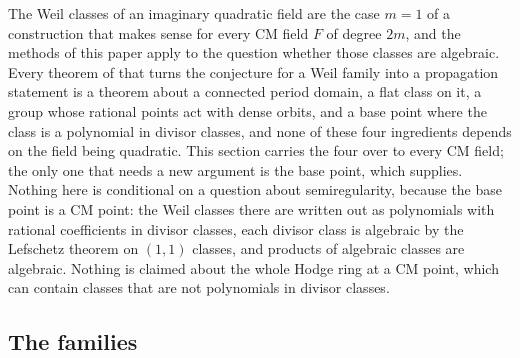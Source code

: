 \documentclass[11pt,reqno]{amsart}
\theoremstyle{plain}
\theoremstyle{definition}
\theoremstyle{remark}
\begin{document}
The Weil classes of an imaginary quadratic field are the case $m=1$ of a
construction that makes sense for every CM field $F$ of degree $2m$, and the
methods of this paper apply to the question whether those classes are
algebraic. Every theorem of  that turns the conjecture
for a Weil family into a propagation statement is a theorem about a connected
period domain, a flat class on it, a group whose rational points act with
dense orbits, and a base point where the class is a polynomial in divisor
classes, and none of these four ingredients depends on the field being
quadratic. This section carries the four over to every CM field; the only
one that needs a new argument is the base point, which
 supplies. Nothing here is conditional on a question
about semiregularity, because the base point is a CM point: the Weil classes
there are written out as polynomials with rational coefficients in divisor
classes, each divisor class is algebraic by the Lefschetz theorem on $(1,1)$
classes, and products of algebraic classes are algebraic. Nothing is claimed
about the
whole Hodge ring at a CM point, which can contain classes that are not
polynomials in divisor classes.

\subsection{The families}
\end{document}
